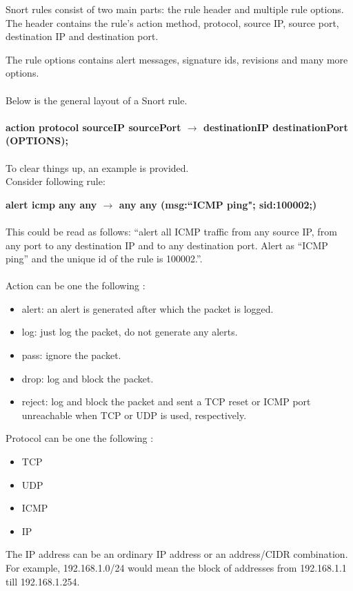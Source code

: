Snort rules consist of two main parts: the rule header and multiple rule options. The header contains the rule's action method, protocol, source IP, source port, destination IP and destination port.

The rule options contains alert messages, signature ids, revisions and many more options. \\ \\
Below is the general layout of a Snort rule. \\ \\
\textbf{action protocol sourceIP sourcePort $\rightarrow$ destinationIP destinationPort (OPTIONS);} \\ \\
To clear things up, an example is provided. \\
Consider following rule:

\textbf{alert icmp any any $\rightarrow$ any any (msg:``ICMP ping"; sid:100002;)} \\ \\
This could be read as follows: ``alert all ICMP traffic from any source IP, from any port to any destination IP and to any destination port. Alert as ``ICMP ping'' and the unique id of the rule is 100002.''. \\ \\
Action can be one the following \citep{SnortRules}:
\begin{itemize}
\item alert: an alert is generated after which the packet is logged.
\item log: just log the packet, do not generate any alerts.
\item pass: ignore the packet.
\item drop: log and block the packet.
\item reject: log and block the packet and sent a TCP reset or ICMP port unreachable when TCP or UDP is used, respectively.
\end{itemize}
Protocol can be one the following \citep{SnortRules}:
\begin{itemize}
\item TCP
\item UDP
\item ICMP
\item IP
\end{itemize}
The IP address can be an ordinary IP address or an address/CIDR combination. For example, 192.168.1.0/24 would mean the block of addresses from 192.168.1.1 till 192.168.1.254.

